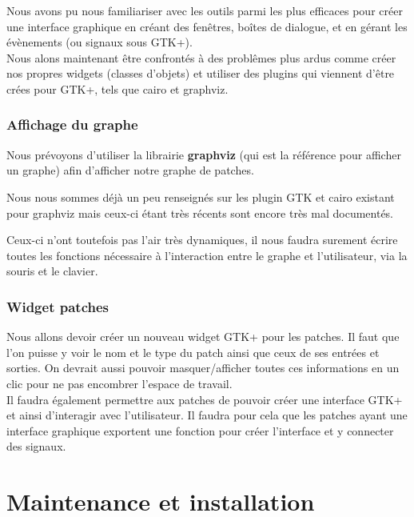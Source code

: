 \documentclass[14pt,a4paper]{report}
\begin{document}
Nous avons pu nous familiariser avec les outils parmi les plus efficaces
pour cr\'eer une interface graphique en cr\'eant des fen\^etres, 
bo\^ites de dialogue, et en g\'erant les \'ev\`enements (ou signaux sous GTK+).
\\

Nous alons maintenant \^etre confront\'es \`a des probl\^emes plus ardus
comme cr\'eer nos propres widgets (classes d'objets) et utiliser des plugins
qui viennent d'\^etre cr\'ees pour GTK+, tels que cairo et graphviz. \\


\subsection{Affichage du graphe}

Nous pr\'evoyons d'utiliser la librairie {\bf graphviz} (qui est la
r\'ef\'erence pour afficher un graphe) afin d'afficher notre graphe
de patches.

Nous nous sommes d\'ej\`a un peu renseign\'es sur les plugin GTK
et cairo existant pour graphviz mais ceux-ci \'etant tr\`es
r\'ecents sont encore tr\`es mal document\'es.

Ceux-ci n'ont toutefois pas l'air tr\`es dynamiques, il nous faudra
surement \'ecrire toutes les fonctions n\'ecessaire \`a l'interaction
entre le graphe et l'utilisateur, via la souris et le clavier.
\\

\subsection{Widget patches}

Nous allons devoir cr\'eer un nouveau widget GTK+ pour les patches.
Il faut que l'on puisse y voir le nom et le type du patch ainsi que
ceux de ses entr\'ees et sorties. On devrait aussi pouvoir
masquer/afficher toutes ces informations en un clic pour ne pas
encombrer l'espace de travail. \\

Il faudra \'egalement permettre aux patches de pouvoir cr\'eer une
interface GTK+ et ainsi d'interagir avec l'utilisateur.
Il faudra pour cela que les patches ayant une interface graphique
exportent une fonction pour cr\'eer l'interface et y connecter des signaux.

\newpage

\chapter{Maintenance et installation}
\end{document}
